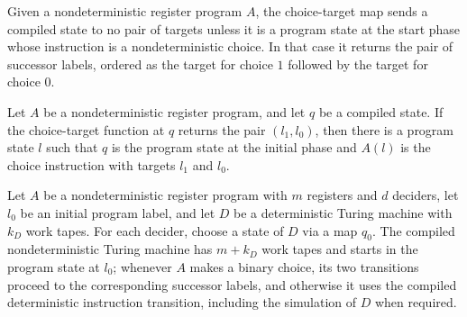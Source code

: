 \begin{definition}
\label{Complexity.LogProg.nchoice}
\leanok
{}
Given a nondeterministic register program $A$, the choice-target map sends a compiled
state to no pair of targets unless it is a program state at the start phase whose
instruction is a nondeterministic choice. In that case it returns the pair of successor
labels, ordered as the target for choice $1$ followed by the target for choice $0$.
\end{definition}

\begin{lemma}
\label{Complexity.LogProg.nchoice_spec}
\leanok
{}
Let $A$ be a nondeterministic register program, and let $q$ be a compiled state. If the
choice-target function at $q$ returns the pair $(l_1,l_0)$, then there is a program
state $l$ such that $q$ is the program state at the initial phase and $A(l)$ is the
choice instruction with targets $l_1$ and $l_0$.
\end{lemma}

\begin{definition}
\label{Complexity.LogProg.ncompileTM}
\leanok
{}
Let $A$ be a nondeterministic register program with $m$ registers and $d$ deciders, let
$l_0$ be an initial program label, and let $D$ be a deterministic Turing machine with
$k_D$ work tapes. For each decider, choose a state of $D$ via a map $q_0$. The compiled
nondeterministic Turing machine has $m+k_D$ work tapes and starts in the program state
at $l_0$; whenever $A$ makes a binary choice, its two transitions proceed to the
corresponding successor labels, and otherwise it uses the compiled deterministic
instruction transition, including the simulation of $D$ when required.
\end{definition}

